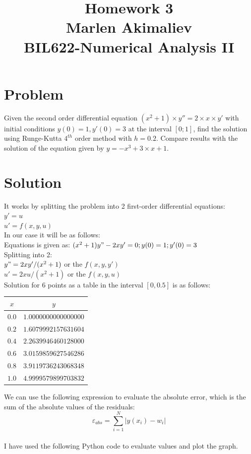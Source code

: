 \documentclass[a4paper,10pt]{article}
\date{\displaydate{date}}
\title{Homework 3\\Marlen Akimaliev\\BIL622-Numerical Analysis II}
\begin{document}
\maketitle

\section{Problem}
Given the second order differential equation $(x^2+1)\times y'' = 2 \times x \times y'$ with initial conditions $y(0)=1, y'(0)=3$ at the interval $[0;1]$, find the solution using Runge-Kutta $4^{th}$ order method with $h=0.2$. Compare results with the solution of the equation given by $y = -x^3+3 \times x +1$.
\section{Solution}
It works by splitting the problem into 2 first-order differential equations:\\
$y'=u$\\
$u'=f(x,y,u)$\\
In our case it will be as follows:\\
Equations is given as: $(x^2+1)y"-2xy'=0; y(0)=1;y'(0)=3$\\
Splitting into 2:\\
$y"=2xy'/(x^2+1)$ or the $f(x,y,y')$\\
$u'=2xu/(x^2+1)$ or the $f(x,y,u)$\\
Solution for 6 points as a table in the interval $[0, 0.5]$ is as follows:
\begin{center}
\begin{tabular}{ |c|c| } 
 \hline
 $x$ & $y$\\
\hline
 $0.0$ & $1.0000000000000000$\\
 $0.2$ & $1.6079992157631604$\\
 $0.4$ & $2.2639946460128000$\\
 $0.6$ & $3.0159859627546286$\\
 $0.8$ & $3.9119736243068348$\\
 $1.0$ & $4.9999579899703832$\\
 \hline
\end{tabular}
\end{center}
We can use the following expression to evaluate the absolute error, which is the sum of the absolute values of the residuals:\\
$$\varepsilon_{abs} = \sum_{i=1}^{N} |y(x_i)-w_i|$$\\
I have used the following Python code \cite{klopper} to evaluate values and plot the graph.
\end{document}
